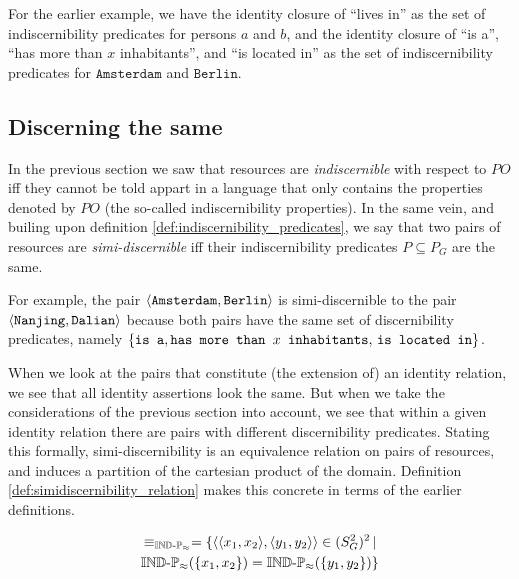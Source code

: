 \noindent For the earlier example, we have the identity closure of
  ``lives in'' as the set of indiscernibility predicates
  for persons $a$ and $b$,
  and the identity closure of ``is a'', ``has more than $x$ inhabitants'',
  and ``is located in'' as the set of indiscernibility predicates for
  $\texttt{Amsterdam}$ and $\texttt{Berlin}$.



\subsection{Discerning the same}

In the previous section we saw that resources are \emph{indiscernible}
  with respect to $PO$ iff they cannot be told appart
  in a language that only contains the properties denoted by $PO$
  (the so-called indiscernibility properties).
In the same vein,
  and builing upon definition \ref{def:indiscernibility_predicates},
  we say that two pairs of resources are \emph{simi-discernible}
  iff their indiscernibility predicates $P \subseteq P_G$ are the same.

For example, the pair $\langle\texttt{Amsterdam},\texttt{Berlin}\rangle$
  is simi-discernible to the pair $\langle\texttt{Nanjing},\texttt{Dalian}\rangle$
  because both pairs have the same set of discernibility predicates,
  namely $\set{\texttt{is a},\texttt{has more than } x \texttt{ inhabitants},$
  $\texttt{is located in}}$.

When we look at the pairs that constitute (the extension of)
  an identity relation, we see that all identity assertions look the same.
But when we take the considerations of the previous section into account,
  we see that within a given identity relation
  there are pairs with different discernibility predicates.
Stating this formally,
  simi-discernibility is an equivalence relation on pairs of resources,
  and induces a partition of the cartesian product of the domain.
Definition \ref{def:simidiscernibility_relation} makes this concrete
  in terms of the earlier definitions.

\begin{definition}
\label{def:simidiscernibility_relation}
\begin{align}
  \equiv_{\operatorname{{\mathbb{IND}-\mathbb{P}}}_{\approx}}
=
  \{
    \langle\langle x_1,x_2\rangle,\langle y_1,y_2\rangle\rangle \in (S_G^2)^2
  \,\vert\,\nonumber\\
    \operatorname{{\mathbb{IND}-\mathbb{P}}}_{\approx}(\{x_1,x_2\}) = \operatorname{{\mathbb{IND}-\mathbb{P}}}_{\approx}(\{y_1,y_2\})
  \}\nonumber
\end{align}
\end{definition}



